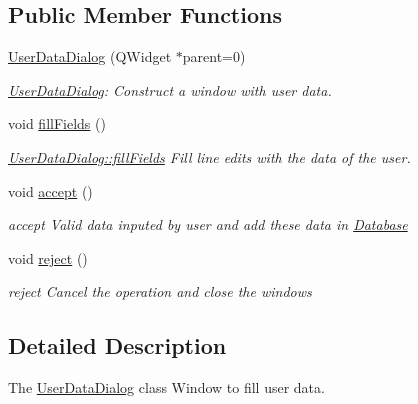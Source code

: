 \subsection*{Public Member Functions}
\begin{DoxyCompactItemize}
\item 
\hyperlink{classUserDataDialog_a51210d5e027d49b019fcd565d5b20e06}{User\-Data\-Dialog} (Q\-Widget $\ast$parent=0)
\begin{DoxyCompactList}\small\item\em \hyperlink{classUserDataDialog}{User\-Data\-Dialog}\-: Construct a window with user data. \end{DoxyCompactList}\item 
\hypertarget{classUserDataDialog_a22f266169243757212ba7eb61d083ddb}{void \hyperlink{classUserDataDialog_a22f266169243757212ba7eb61d083ddb}{fill\-Fields} ()}\label{classUserDataDialog_a22f266169243757212ba7eb61d083ddb}

\begin{DoxyCompactList}\small\item\em \hyperlink{classUserDataDialog_a22f266169243757212ba7eb61d083ddb}{User\-Data\-Dialog\-::fill\-Fields} Fill line edits with the data of the user. \end{DoxyCompactList}\item 
\hypertarget{classUserDataDialog_ad6ba344db1a10b804ca8f5f9a6ffed2c}{void \hyperlink{classUserDataDialog_ad6ba344db1a10b804ca8f5f9a6ffed2c}{accept} ()}\label{classUserDataDialog_ad6ba344db1a10b804ca8f5f9a6ffed2c}

\begin{DoxyCompactList}\small\item\em accept Valid data inputed by user and add these data in \hyperlink{classDatabase}{Database} \end{DoxyCompactList}\item 
\hypertarget{classUserDataDialog_a54519d6441212d50849de7b72ac5e623}{void \hyperlink{classUserDataDialog_a54519d6441212d50849de7b72ac5e623}{reject} ()}\label{classUserDataDialog_a54519d6441212d50849de7b72ac5e623}

\begin{DoxyCompactList}\small\item\em reject Cancel the operation and close the windows \end{DoxyCompactList}\end{DoxyCompactItemize}


\subsection{Detailed Description}
The \hyperlink{classUserDataDialog}{User\-Data\-Dialog} class Window to fill user data. 

